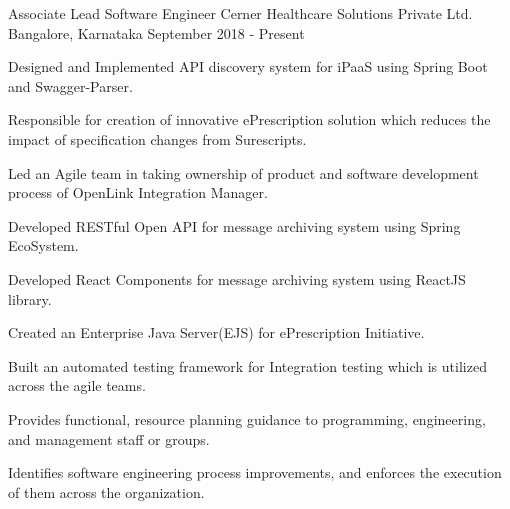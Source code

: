 

\begin{cventries}

  \cventry
    {Associate Lead Software Engineer} %
    {Cerner Healthcare Solutions Private Ltd.} %
    {Bangalore, Karnataka} %
    {September 2018 - Present} %
    {
      \begin{cvitems} %
        \item {Designed and Implemented API discovery system for iPaaS using Spring Boot and Swagger-Parser.}
        \item {Responsible for creation of innovative ePrescription solution which reduces the impact of specification changes from Surescripts.}
        \item {Led an Agile team in taking ownership of product and software development process of OpenLink Integration Manager.}
        \item {Developed RESTful Open API for message archiving system using Spring EcoSystem.}
        \item {Developed React Components for message archiving system using ReactJS library.}
        \item {Created an Enterprise Java Server(EJS) for ePrescription Initiative.}
        \item {Built an automated testing framework for Integration testing which is utilized across the agile teams.}
        \item {Provides functional, resource planning guidance to programming, engineering, and management staff or groups.}
        \item {Identifies software engineering process improvements, and enforces the execution of them across the organization.}
      \end{cvitems}
    }
  

\end{cventries}
